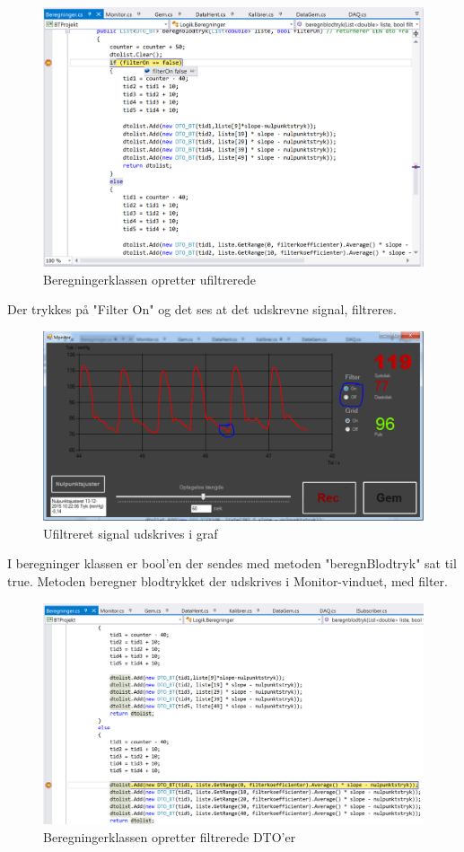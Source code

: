 \begin{figure}[H]
	\centering
	\includegraphics[width=1\textwidth]{Figurer/Test_Aktiver_2}
	\caption{Beregningerklassen opretter ufiltrerede}
\end{figure}

Der trykkes på "Filter On" og det ses at det udskrevne signal, filtreres.

\begin{figure}[H]
	\centering
	\includegraphics[width=1\textwidth]{Figurer/Test_Aktiver_3}
	\caption{Ufiltreret signal udskrives i graf}
\end{figure}

I beregninger klassen er bool'en der sendes med metoden "beregnBlodtryk" sat til true. Metoden beregner blodtrykket der udskrives i Monitor-vinduet, med filter.

\begin{figure}[H]
	\centering
	\includegraphics[width=1\textwidth]{Figurer/Test_Aktiver_4}
	\caption{Beregningerklassen opretter filtrerede DTO'er}
\end{figure}

